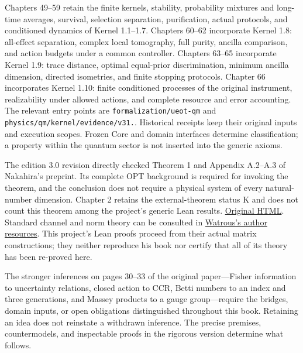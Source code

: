 \documentclass[
  11pt,
  oneside]{book}
\begin{document}
Chapters 49--59 retain the finite kernels, stability, probability
mixtures and long-time averages, survival, selection separation,
purification, actual protocols, and conditioned dynamics of Kernel
1.1--1.7. Chapters 60--62 incorporate Kernel 1.8: all-effect separation,
complex local tomography, full purity, ancilla comparison, and action
budgets under a common controller. Chapters 63--65 incorporate Kernel
1.9: trace distance, optimal equal-prior discrimination, minimum ancilla
dimension, directed isometries, and finite stopping protocols. Chapter
66 incorporates Kernel 1.10: finite conditioned processes of the
original instrument, realizability under allowed actions, and complete
resource and error accounting. The relevant entry points are
\texttt{formalization/\allowbreak ueot-\allowbreak qm} and
\texttt{physics/\allowbreak qm/\allowbreak kernel/\allowbreak evidence/\allowbreak v31.}. Historical receipts keep
their original inputs and execution scopes. Frozen Core and domain
interfaces determine classification; a property within the quantum
sector is not inserted into the generic axioms.

The edition 3.0 revision directly checked Theorem 1 and Appendix
A.2--A.3 of Nakahira's preprint. Its complete OPT background is required
for invoking the theorem, and the conclusion does not require a physical
system of every natural-number dimension. Chapter 2 retains the
external-theorem status K and does not count this theorem among the
project's generic Lean results.
\href{https://arxiv.org/html/2605.23217v1}{Original HTML}. Standard
channel and norm theory can be consulted in
\href{https://cs.uwaterloo.ca/~watrous/TQI/}{Watrous's author
resources}. This project's Lean proofs proceed from their actual matrix
constructions; they neither reproduce his book nor certify that all of
its theory has been re-proved here.

The stronger inferences on pages 30--33 of the original paper---Fisher
information to uncertainty relations, closed action to CCR, Betti
numbers to an index and three generations, and Massey products to a
gauge group---require the bridges, domain inputs, or open obligations
distinguished throughout this book. Retaining an idea does not reinstate
a withdrawn inference. The precise premises, countermodels, and
inspectable proofs in the rigorous version determine what follows.
\end{document}
